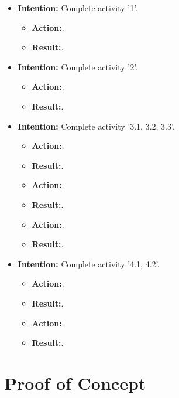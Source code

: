\documentclass{article}
\begin{document}
\begin{itemize}

\item{\textbf{Intention:} Complete activity '1'.}

\begin{itemize}
\item{\textbf{Action:}.}
\item{\textbf{Result:}.}
\end{itemize}

\item{\textbf{Intention:} Complete activity '2'.}

\begin{itemize}
\item{\textbf{Action:}.}
\item{\textbf{Result:}.}
\end{itemize}

\item{\textbf{Intention:} Complete activity '3.1, 3.2, 3.3'.}

\begin{itemize}
\item{\textbf{Action:}.}
\item{\textbf{Result:}.}

\item{\textbf{Action:}.}
\item{\textbf{Result:}.}

\item{\textbf{Action:}.}
\item{\textbf{Result:}.}


\end{itemize}

\item{\textbf{Intention:} Complete activity '4.1, 4.2'.}

\begin{itemize}
\item{\textbf{Action:}.}
\item{\textbf{Result:}.}

\item{\textbf{Action:}.}
\item{\textbf{Result:}.}


\end{itemize}




 
\end{itemize}

\section{Proof of Concept}
\end{document}
